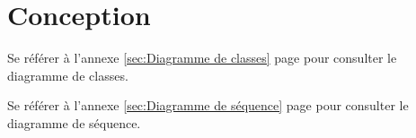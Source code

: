 \section{Conception}
\label{sec:Conception}
  \par Se référer à l'annexe \ref{sec:Diagramme de classes} page \pageref{sec:Diagramme de classes} pour consulter le diagramme de classes. \\
  \par Se référer à l'annexe \ref{sec:Diagramme de séquence} page \pageref{sec:Diagramme de séquence} pour consulter le diagramme de séquence.
\pagebreak
